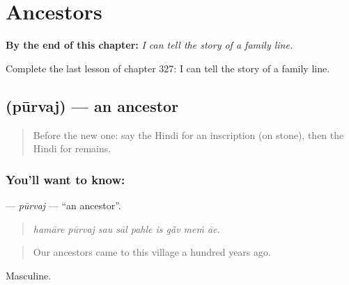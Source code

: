 
\chapter{Ancestors}
\label{ch:hi-ancestors}

\begin{chapteropening}
\textbf{By the end of this chapter:} \emph{I can tell the story of a family line.}

Complete the last lesson of chapter 327: I can tell the story of a family line.
\end{chapteropening}

\section[\texorpdfstring{\hi{पूर्वज} (pūrvaj)}{पूर्वज (pūrvaj)}]{ (pūrvaj) — an ancestor}

\label{lesson:HI-C327-purvaj}



\begin{quote}
Before the new one: say the Hindi for an inscription (on stone), then the Hindi for remains.
\end{quote}

\subsection*{You'll want to know: }
\textbf{} — \emph{pūrvaj} — \textquotedblleft{}an ancestor\textquotedblright{}.

\begin{quote}
        
\end{quote}

\begin{quote}
\emph{hamāre pūrvaj sau sāl pahle is gā̃v meṁ āe.}
\end{quote}

\begin{quote}
Our ancestors came to this village a hundred years ago.
\end{quote}

Masculine.

